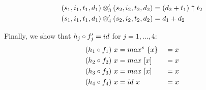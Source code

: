 \documentclass{article}
\begin{document}
\begin{align*}
    (s_1, i_1, t_1, d_1)
    \otimes'_3
    (s_2, i_2, t_2, d_2)
    &= (d_2 + t_1) \uparrow t_2   \\
    (s_1, i_1, t_1, d_1)
    \otimes'_4
    (s_2, i_2, t_2, d_2)
    &= d_1 + d_2                \\
\end{align*}

Finally, we show that $h_j \mathbin{\circ} f'_j = id$ for $j = 1, \ldots , 4$:
\begin{alignat*}{2}
    (h_1 \mathbin{\circ} f_1)\ x &= max^s\ \{ x \} \ &= x \\
    (h_2 \mathbin{\circ} f_2)\ x &= max\     [x]   \ &= x \\
    (h_3 \mathbin{\circ} f_3)\ x &= max\     [x]   \ &= x \\
    (h_4 \mathbin{\circ} f_4)\ x &= id\       x    \ &= x \\
\end{alignat*}
\end{document}
